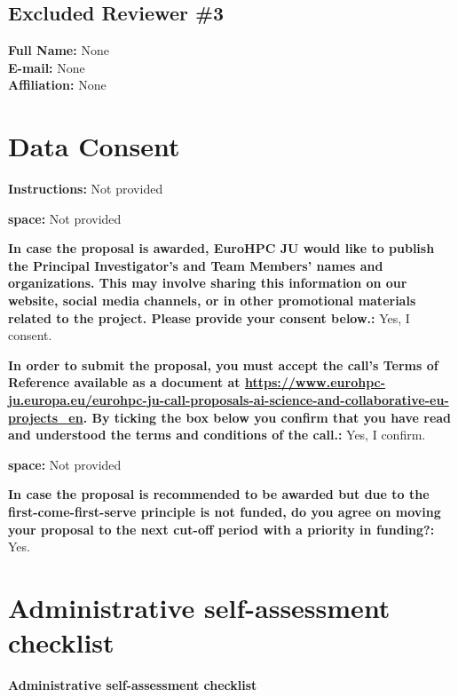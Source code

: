 \documentclass[11pt, a4paper]{article}
\begin{document}
\subsection*{Excluded Reviewer \#3}

\noindent\textbf{Full Name:} None \\
\textbf{E-mail:} None \\
\textbf{Affiliation:} None

\section*{Data Consent}

\noindent\textbf{Instructions:} Not provided

\vspace{0.5em}
\noindent\textbf{space:} Not provided

\vspace{0.5em}
\noindent\textbf{In case the proposal is awarded, EuroHPC JU would like to publish the Principal Investigator’s and Team Members’ names and organizations. This may involve sharing this information on our website, social media channels, or in other promotional materials related to the project. Please provide your consent below.:} Yes, I consent.

\vspace{0.5em}
\noindent\textbf{In order to submit the proposal, you must accept the call's Terms of Reference available as a document at \url{https://www.eurohpc-ju.europa.eu/eurohpc-ju-call-proposals-ai-science-and-collaborative-eu-projects_en}. By ticking the box below you confirm that you have read and understood the terms and conditions of the call.:} Yes, I confirm.

\vspace{0.5em}
\noindent\textbf{space:} Not provided

\vspace{0.5em}
\noindent\textbf{In case the proposal is recommended to be awarded but due to the first-come-first-serve principle is not funded, do you agree on moving your proposal to the next cut-off period with a priority in funding?:} Yes.

\section*{Administrative self-assessment checklist}

\noindent\textbf{Administrative self-assessment checklist}
\end{document}

